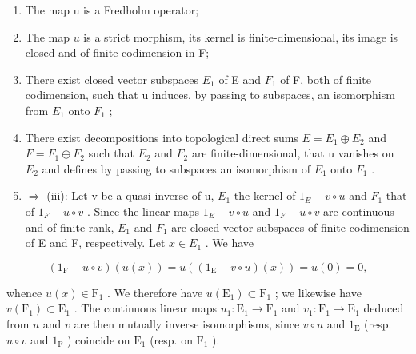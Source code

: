 \begin{enumerate}
\def\labelenumi{(\roman{enumi})}
\item
  The map u is a Fredholm operator;
\item
  The map \(u\) is a strict morphism, its kernel is finite-dimensional, its image is closed and of finite codimension in F;
\item
  There exist closed vector subspaces \(E_{1}\) of E and \(F_{1}\) of F, both of finite codimension, such that u induces, by passing to subspaces, an isomorphism from \(E_{1}\) onto \(F_{1}\) ;
\item
   There exist decompositions into topological direct sums \(E = E_{1} \oplus E_{2}\) and \(F = F_{1} \oplus F_{2}\) such that \(E_{2}\) and \(F_{2}\) are finite-dimensional, that u vanishes on \(E_{2}\) and defines by passing to subspaces an isomorphism of \(E_{1}\) onto \(F_{1}\) .
\item
  \(\Longrightarrow\) (iii): Let v be a quasi-inverse of u, \(E_{1}\) the kernel of \(1_{E}-v\circ u\) and \(F_{1}\) that of \(1_{F}-u\circ v\) . Since the linear maps \(1_{E}-v\circ u\) and \(1_{F}-u\circ v\) are continuous and of finite rank, \(E_{1}\) and \(F_{1}\) are closed vector subspaces of finite codimension of E and F, respectively. Let \(x\in E_{1}\) . We have
\end{enumerate}

\[
(1 _ {\mathrm{F}} - u \circ v) (u (x)) = u ((1 _ {\mathrm{E}} - v \circ u) (x)) = u (0) = 0,
\]

whence \(u(x) \in \mathrm{F}_1\) . We therefore have \(u(\mathrm{E}_1) \subset \mathrm{F}_1\) ; we likewise have \(v(\mathrm{F}_1) \subset \mathrm{E}_1\) . The continuous linear maps \(u_1: \mathrm{E}_1 \to \mathrm{F}_1\) and \(v_1: \mathrm{F}_1 \to \mathrm{E}_1\) deduced from \(u\) and \(v\) are then mutually inverse isomorphisms, since \(v \circ u\) and \(1_{\mathrm{E}}\) (resp. \(u \circ v\) and \(1_{\mathrm{F}}\) ) coincide on \(\mathrm{E}_1\) (resp. on \(\mathrm{F}_1\) ).

